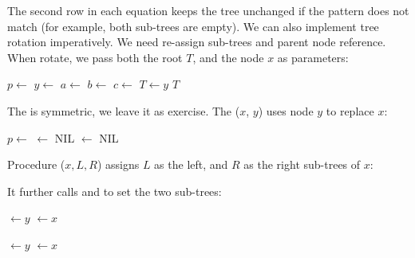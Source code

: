 \documentclass[b5paper]{article}
\begin{document}
The second row in each equation keeps the tree unchanged if the pattern does not match (for example, both sub-trees are empty). We can also implement tree rotation imperatively. We need re-assign sub-trees and parent node reference. When rotate, we pass both the root $T$, and the node $x$ as parameters:

\begin{algorithmic}[1]
  \State $p \gets$ 
  \State $y \gets$  
  \State $a \gets$ 
  \State $b \gets$ 
  \State $c \gets$ 
  \State {}  
  \State {} 
  \State {} 
    
    \State $T \gets y$
  \EndIf
  \State \Return $T$
\EndFunction
\end{algorithmic}

The  is symmetric, we leave it as exercise. The ($x$, $y$) uses node $y$ to replace $x$:

\begin{algorithmic}[1]
  \State $p \gets$ 
   
            $\gets$ NIL
    \EndIf
    \State {}
  \Else
    \State {}
  \EndIf
  \State {} $\gets$ NIL
\EndFunction
\end{algorithmic}

Procedure ($x, L, R$) assigns $L$ as the left, and $R$ as the right sub-trees of $x$:

\begin{algorithmic}[1]
  \State {}
  \State {}
\EndFunction
\end{algorithmic}

It further calls  and  to set the two sub-trees:

\begin{algorithmic}[1]
  \State {} $\gets y$
     $\gets x$
  \EndIf
  \EndFunction

\Statex

  \State {} $\gets y$
     $\gets x$
  \EndIf
\EndFunction
\end{algorithmic}
\end{document}

